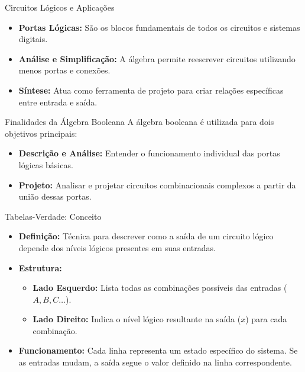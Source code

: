 \begin{frame}{Circuitos Lógicos e Aplicações}
    \begin{itemize}
        \item \textbf{Portas Lógicas:} São os blocos fundamentais de todos os circuitos e sistemas digitais.
        \item \textbf{Análise e Simplificação:} A álgebra permite reescrever circuitos utilizando menos portas e conexões.
        \item \textbf{Síntese:} Atua como ferramenta de projeto para criar relações específicas entre entrada e saída.
    \end{itemize}
\end{frame}

\begin{frame}{Finalidades da Álgebra Booleana}
    A álgebra booleana é utilizada para dois objetivos principais:
    \begin{itemize}
        \item \textbf{Descrição e Análise:} Entender o funcionamento individual das portas lógicas básicas.
        \item \textbf{Projeto:} Analisar e projetar circuitos combinacionais complexos a partir da união dessas portas.
    \end{itemize}
\end{frame}


\begin{frame}{Tabelas-Verdade: Conceito}
    \begin{itemize}
        \item \textbf{Definição:} Técnica para descrever como a saída de um circuito lógico depende dos níveis lógicos presentes em suas entradas.
        \item \textbf{Estrutura:}
              \begin{itemize}
                  \item \textbf{Lado Esquerdo:} Lista todas as combinações possíveis das entradas ($A, B, C \dots$).
                  \item \textbf{Lado Direito:} Indica o nível lógico resultante na saída ($x$) para cada combinação.
              \end{itemize}
        \item \textbf{Funcionamento:} Cada linha representa um estado específico do sistema. Se as entradas mudam, a saída segue o valor definido na linha correspondente.
    \end{itemize}
\end{frame}

